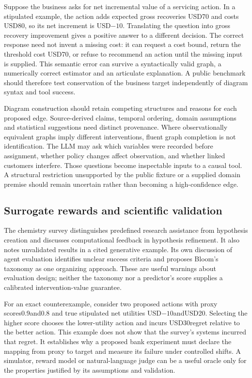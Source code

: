 Suppose the business asks for net incremental value of a servicing action. In a stipulated example, the action adds expected gross recoveries USD70 and costs USD80, so its net increment is USD$-10$. Translating the question into gross recovery improvement gives a positive answer to a different decision. The correct response need not invent a missing cost: it can request a cost bound, return the threshold cost USD70, or refuse to recommend an action until the missing input is supplied. This semantic error can survive a syntactically valid graph, a numerically correct estimator and an articulate explanation. A public benchmark should therefore test conservation of the business target independently of diagram syntax and tool success.\citep{exec25_cow_reference}

Diagram construction should retain competing structures and reasons for each proposed edge. Source-derived claims, temporal ordering, domain assumptions and statistical suggestions need distinct provenance. Where observationally equivalent graphs imply different interventions, fluent graph completion is not identification. The LLM may ask which variables were recorded before assignment, whether policy changes affect observation, and whether linked customers interfere. Those questions become inspectable inputs to a causal tool. A structural restriction unsupported by the public fixture or a supplied domain premise should remain uncertain rather than becoming a high-confidence edge.\citep{exec25_cow_reference}

\subsection{Surrogate rewards and scientific validation}

The chemistry survey distinguishes predefined research assistance from hypothesis creation and discusses computational feedback in hypothesis refinement. It also notes unvalidated results in a cited generative example. Its own discussion of agent evaluation identifies unclear success criteria and proposes Bloom's taxonomy as one organizing approach. These are useful warnings about evaluation design; neither the taxonomy nor a predictor's score supplies a calibrated intervention-value guarantee.\citep{exec25_cow_chemistry}

For an exact counterexample, consider two proposed actions with proxy scores0.9and0.8 and true stipulated net utilities USD$-10$andUSD20. Selecting the higher score chooses the lower-utility action and incurs USD30regret relative to the better action. This example does not show that the survey's systems incurred that regret. It establishes why a proposed bank experiment must declare the mapping from proxy to target and measure its failure under controlled shifts. A simulator, reward model or natural-language judge can be a useful oracle only for the properties justified by its assumptions and validation.\citep{exec25_cow_reference}

